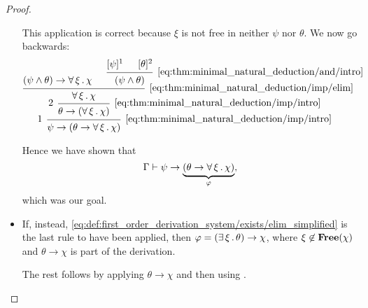 \begin{proof}
\begin{itemize}
    This application is correct because \( \xi \) is not free in neither \( \psi \) nor \( \theta \). We now go backwards:
    \begin{equation*}
      \begin{prooftree}
        \hypo{ (\psi \wedge \theta) \rightarrow \qforall \xi \chi }

        \hypo{ [\psi]^1 }
        \hypo{ [\theta]^2 }
        \infer2[\eqref{eq:thm:minimal_natural_deduction/and/intro}]{ (\psi \wedge \theta) }
        \infer2[\eqref{eq:thm:minimal_natural_deduction/imp/elim}]{ \qforall \xi \chi }
        \infer[left label=\( 2 \)]1[\eqref{eq:thm:minimal_natural_deduction/imp/intro}]{ \theta \rightarrow (\qforall \xi \chi) }
        \infer[left label=\( 1 \)]1[\eqref{eq:thm:minimal_natural_deduction/imp/intro}]{ \psi \rightarrow (\theta \rightarrow \qforall \xi \chi) }
      \end{prooftree}
    \end{equation*}

    Hence we have shown that
    \begin{equation*}
      \Gamma \vdash \psi \rightarrow \underbrace{(\theta \rightarrow \forall \thinspace \xi \thinspace . \thinspace \chi)}_{\varphi},
    \end{equation*}
    which was our goal.

    \item If, instead, \eqref{eq:def:first_order_derivation_system/exists/elim_simplified} is the last rule to have been applied, then \( \varphi = (\exists \thinspace \xi \thinspace . \thinspace \theta) \rightarrow \chi \), where \( \xi \not\in \operatorname{\mathbf{Free}}(\chi) \) and \( \theta \rightarrow \chi \) is part of the derivation.

    The rest follows by applying  \( \theta \rightarrow \chi \) and then using .
  \end{itemize}
\end{proof}
